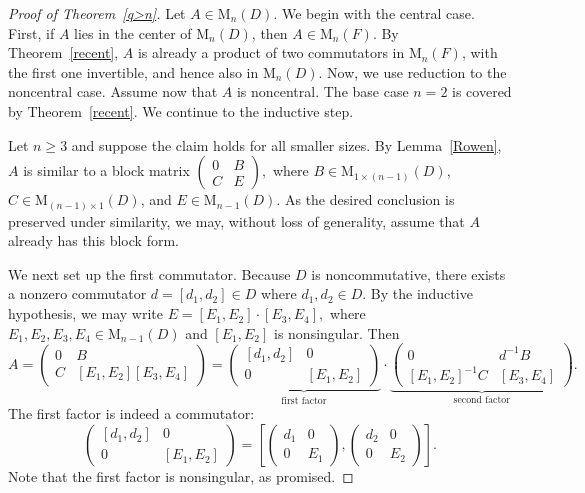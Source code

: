 \documentclass[11pt]{article}
\theoremstyle{definition}
\begin{document}
{{{{\begin{proof}[Proof of Theorem~\ref{q>n}]
					Let $A \in \mathrm{M}_n(D)$.  We begin with the central case. First, if $A$ lies in the center of $\mathrm{M}_n(D)$, then $A \in \mathrm{M}_n(F)$. By Theorem~\ref{recent}, $A$ is already a product of two commutators in $\mathrm{M}_n(F)$, with the first one invertible, and hence also in $\mathrm{M}_n(D)$. Now, we use reduction to the noncentral case. Assume now that $A$ is noncentral.	The base case $n = 2$ is covered by Theorem~\ref{recent}. We continue to the  inductive step.
					
					Let $n \ge 3$ and suppose the claim holds for all smaller sizes. By Lemma~\ref{Rowen}, $A$ is similar to a block matrix
					$
					\begin{pmatrix}
						0 & B \\
						C & E
					\end{pmatrix},
					$
					where $B \in \mathrm{M}_{1 \times (n-1)}(D)$, $C \in \mathrm{M}_{(n-1) \times 1}(D)$, and $E \in \mathrm{M}_{n-1}(D)$. As the desired conclusion is preserved under similarity, we may, without loss of generality, assume that $A$ already has this block form.
					
					We next set up the first commutator.  Because $D$ is noncommutative, there exists a nonzero commutator $d = [d_1, d_2] \in D$ where $d_1,d_2\in D$. By the inductive hypothesis, we may write
					$
					E = [E_1, E_2] \cdot [E_3, E_4],
					$
					where $E_1,E_2,E_3,E_4\in\mathrm{M}_{n-1}(D)$ and  $[E_1, E_2]$ is nonsingular. Then
					\[
					A =
					\begin{pmatrix}
						0 & B \\
						C & [E_1, E_2][E_3, E_4]
					\end{pmatrix}
					=
					\underbrace{\begin{pmatrix}
							[d_1, d_2] & 0 \\
							0 & [E_1, E_2]
					\end{pmatrix}}_{\text{first factor}}
					\cdot
					\underbrace{\begin{pmatrix}
							0 & d^{-1}B \\
							[E_1, E_2]^{-1}C & [E_3, E_4]
					\end{pmatrix}}_{\text{second factor}}.
					\]
					The first factor is indeed a commutator:
					\[
					\begin{pmatrix}
						[d_1, d_2] & 0 \\
						0 & [E_1, E_2]
					\end{pmatrix}
					=
					\left[
					\begin{pmatrix}
						d_1 & 0 \\
						0 & E_1
					\end{pmatrix},
					\begin{pmatrix}
						d_2 & 0 \\
						0 & E_2
					\end{pmatrix}
					\right].
					\] Note that the first factor is nonsingular, as promised.
					

\end{proof}}}}}
\end{document}
